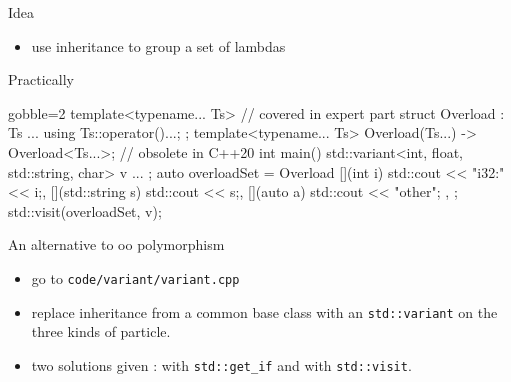 \begin{frame}[fragile]
  \begin{exampleblock}{Idea}
    \begin{itemize}
    \item use inheritance to group a set of lambdas
    \end{itemize}
  \end{exampleblock}
  \begin{block}{Practically}
    \small
    \begin{cppcode*}{gobble=2}
      template<typename... Ts> // covered in expert part
      struct Overload : Ts ... { using Ts::operator()...; };
      template<typename... Ts>
      Overload(Ts...) -> Overload<Ts...>; // obsolete in C++20
      int main(){
        std::variant<int, float, std::string, char> v{ ... };
        auto overloadSet = Overload {
          [](int i) { std::cout << "i32:" << i;},
          [](std::string s) { std::cout << s;},
          [](auto a) { std::cout << "other"; },
        };
        std::visit(overloadSet, v);
      }
    \end{cppcode*}
  \end{block}
\end{frame}

\begin{frame}[fragile]
  \begin{exercise}{An alternative to oo polymorphism}
    \begin{itemize}
      \item go to \texttt{code/variant/variant.cpp}
      \item replace inheritance from a common base class with an \texttt{std::variant} on the three kinds of particle.
      \item two solutions given : with \texttt{std::get_if} and with \texttt{std::visit}.
    \end{itemize}
  \end{exercise}
\end{frame}

